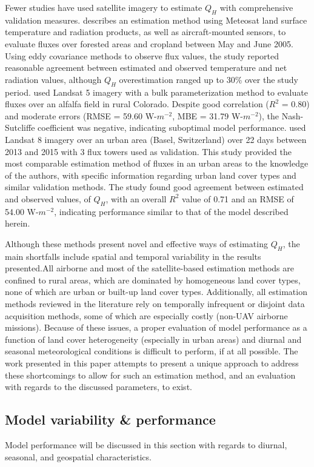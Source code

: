 Fewer studies have used satellite imagery to estimate $Q_H$ with comprehensive validation measures. \citet{Miglietta_2009} describes an estimation method using Meteosat land surface temperature and radiation products, as well as aircraft-mounted sensors, to evaluate fluxes over forested areas and cropland between May and June 2005. Using eddy covariance methods to observe flux values,  the study reported reasonable agreement between estimated and observed temperature and net radiation values, although $Q_H$ overestimation ranged up to 30\% over the study period.  \citet{Mkhwanazi_2012} used Landsat 5 imagery with a bulk parameterization method to evaluate fluxes over an alfalfa field in rural Colorado.  Despite good correlation ($R^2$ = 0.80) and moderate errors (RMSE = 59.60 W-$m^{-2}$, MBE = 31.79 W-$m^{-2}$), the Nash-Sutcliffe coefficient was negative, indicating suboptimal model performance. \citet{Feigenwinter_2018} used Landsat 8 imagery over an urban area (Basel, Switzerland) over 22 days between 2013 and 2015 with 3 flux towers used as validation. This study provided the most comparable estimation method of fluxes in an urban areas to the knowledge of the authors, with specific information regarding urban land cover types and similar validation methods. The study found good agreement between estimated and observed values, of $Q_H$, with an overall $R^2$ value of 0.71 and an RMSE of 54.00 W-$m^{-2}$, indicating performance similar to that of the model described herein.

Although these methods present novel and effective ways of estimating $Q_H$, the main shortfalls include spatial and temporal variability in the results presented.All airborne and most of the satellite-based estimation methods are confined to rural areas, which are dominated by homogeneous land cover types,  none of which are urban or built-up land cover types. Additionally, all estimation methods reviewed in the literature rely on temporally infrequent or disjoint data acquisition methods, some of which are especially costly (non-UAV airborne missions). Because of these issues, a proper evaluation of model performance as a function of land cover heterogeneity (especially in urban areas) and diurnal and seasonal meteorological conditions is difficult to perform, if at all possible. The work presented in this paper attempts to present a unique approach to address these shortcomings to allow for such an estimation method, and an evaluation with regards to the discussed parameters, to exist.

\subsection{Model variability \& performance} \label{section:discussion-model-variability}
Model performance will be discussed in this section with regards to diurnal, seasonal, and geospatial characteristics. 

